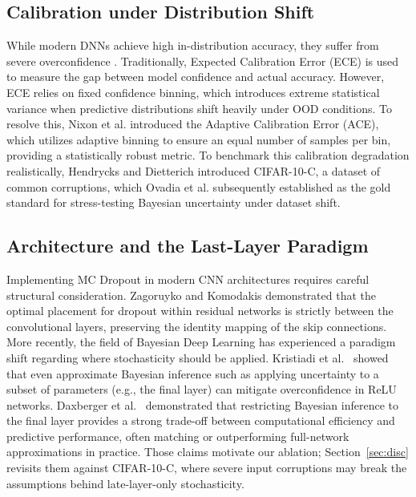 \documentclass[10pt,twocolumn,letterpaper]{article}
\begin{document}
\subsection{Calibration under Distribution Shift}
While modern DNNs achieve high in-distribution accuracy, they suffer from severe overconfidence \cite{guo2017calibration}. Traditionally, Expected Calibration Error (ECE) is used to measure the gap between model confidence and actual accuracy. However, ECE relies on fixed confidence binning, which introduces extreme statistical variance when predictive distributions shift heavily under OOD conditions. To resolve this, Nixon et al. \cite{nixon2019measuring} introduced the Adaptive Calibration Error (ACE), which utilizes adaptive binning to ensure an equal number of samples per bin, providing a statistically robust metric. To benchmark this calibration degradation realistically, Hendrycks and Dietterich \cite{hendrycks2019benchmarking} introduced CIFAR-10-C, a dataset of common corruptions, which Ovadia et al. \cite{ovadia2019can} subsequently established as the gold standard for stress-testing Bayesian uncertainty under dataset shift.

\subsection{Architecture and the Last-Layer Paradigm}
Implementing MC Dropout in modern CNN architectures requires careful structural consideration. Zagoruyko and Komodakis \cite{zagoruyko2016wide} demonstrated that the optimal placement for dropout within residual networks is strictly between the convolutional layers, preserving the identity mapping of the skip connections. More recently, the field of Bayesian Deep Learning has experienced a paradigm shift regarding where stochasticity should be applied. Kristiadi et al.~\cite{kristiadi2020being} showed that even approximate Bayesian inference such as applying uncertainty to a subset of parameters (e.g., the final layer) can mitigate overconfidence in ReLU networks. Daxberger et al.~\cite{daxberger2021laplace} demonstrated that restricting Bayesian inference to the final layer provides a strong trade-off between computational efficiency and predictive performance, often matching or outperforming full-network approximations in practice. Those claims motivate our ablation; Section~\ref{sec:disc} revisits them against CIFAR-10-C, where severe input corruptions may break the assumptions behind late-layer-only stochasticity.

\end{document}
